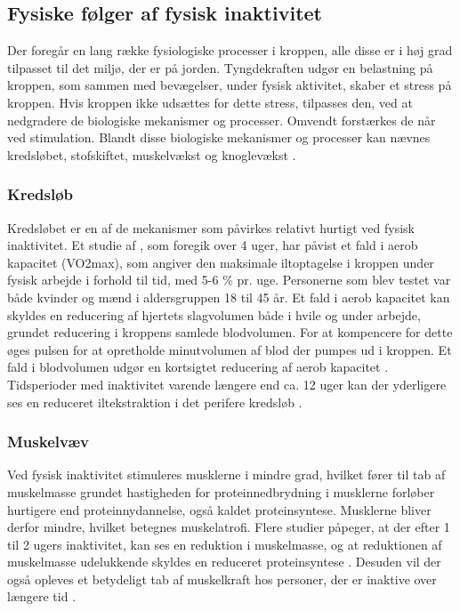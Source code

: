 \subsection{Fysiske følger af fysisk inaktivitet}
Der foregår en lang række fysiologiske processer i kroppen, alle disse er i høj grad tilpasset til det miljø, der er på jorden. 
Tyngdekraften udgør en belastning på kroppen, som sammen med bevægelser, under fysisk aktivitet, skaber et stress på kroppen. 
Hvis kroppen ikke udsættes for dette stress, tilpasses den, ved at nedgradere de biologiske mekanismer og processer. Omvendt forstærkes de når ved stimulation. 
Blandt disse biologiske mekanismer og processer kan nævnes kredsløbet, stofskiftet, muskelvækst og knoglevækst \citep{motionsraad2007}.

\subsubsection{Kredsløb}
Kredsløbet er en af de mekanismer som påvirkes relativt hurtigt ved fysisk inaktivitet. 
Et studie af \citeauthor{Convertino1995}, som foregik over 4 uger, har påvist et fald i aerob kapacitet (VO2max), som angiver den maksimale iltoptagelse i kroppen under fysisk arbejde i forhold til tid, med 5-6 \% pr. uge. 
Personerne som blev testet var både kvinder og mænd i aldersgruppen 18 til 45 år. 
Et fald i aerob kapacitet kan skyldes en reducering af hjertets slagvolumen både i hvile og under arbejde, grundet reducering i kroppens samlede blodvolumen. 
For at kompencere for dette øges pulsen for at opretholde minutvolumen af blod der pumpes ud i kroppen. 
Et fald i blodvolumen udgør en kortsigtet reducering af aerob kapacitet \citep{Convertino1995}. 
Tidsperioder med inaktivitet varende længere end ca. 12 uger kan der yderligere ses en reduceret iltekstraktion i det perifere kredsløb \citep{Coyle1985}.

\subsubsection{Muskelvæv}
Ved fysisk inaktivitet stimuleres musklerne i mindre grad, hvilket fører til tab af muskelmasse grundet hastigheden for proteinnedbrydning i musklerne forløber hurtigere end proteinnydannelse, også kaldet proteinsyntese. 
Musklerne bliver derfor mindre, hvilket betegnes muskelatrofi. 
Flere studier påpeger, at der efter 1 til 2 ugers inaktivitet, kan ses en reduktion i muskelmasse, og at reduktionen af muskelmasse udelukkende skyldes en reduceret proteinsyntese \citep{Douglas2006, Bloomfield1995}. 
Desuden vil der også opleves et betydeligt tab af muskelkraft hos personer, der er inaktive over længere tid \citep{Bloomfield1995}. 

